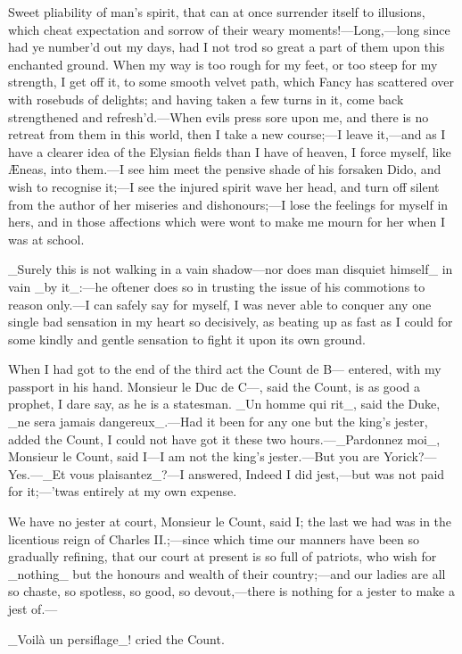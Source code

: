 \documentclass[twoside]{article}
\begin{document}
Sweet pliability of man’s spirit, that can at once surrender itself to
illusions, which cheat expectation and sorrow of their weary
moments!—Long,—long since had ye number’d out my days, had I not trod so
great a part of them upon this enchanted ground.  When my way is too
rough for my feet, or too steep for my strength, I get off it, to some
smooth velvet path, which Fancy has scattered over with rosebuds of
delights; and having taken a few turns in it, come back strengthened and
refresh’d.—When evils press sore upon me, and there is no retreat from
them in this world, then I take a new course;—I leave it,—and as I have a
clearer idea of the Elysian fields than I have of heaven, I force myself,
like Æneas, into them.—I see him meet the pensive shade of his forsaken
Dido, and wish to recognise it;—I see the injured spirit wave her head,
and turn off silent from the author of her miseries and dishonours;—I
lose the feelings for myself in hers, and in those affections which were
wont to make me mourn for her when I was at school.

_Surely this is not walking in a vain shadow—nor does man disquiet
himself_ in vain _by it_:—he oftener does so in trusting the issue of his
commotions to reason only.—I can safely say for myself, I was never able
to conquer any one single bad sensation in my heart so decisively, as
beating up as fast as I could for some kindly and gentle sensation to
fight it upon its own ground.

When I had got to the end of the third act the Count de B— entered, with
my passport in his hand.  Monsieur le Duc de C—, said the Count, is as
good a prophet, I dare say, as he is a statesman.  _Un homme qui rit_,
said the Duke, _ne sera jamais dangereux_.—Had it been for any one but
the king’s jester, added the Count, I could not have got it these two
hours.—_Pardonnez moi_, Monsieur le Count, said I—I am not the king’s
jester.—But you are Yorick?—Yes.—_Et vous plaisantez_?—I answered, Indeed
I did jest,—but was not paid for it;—’twas entirely at my own expense.

We have no jester at court, Monsieur le Count, said I; the last we had
was in the licentious reign of Charles II.;—since which time our manners
have been so gradually refining, that our court at present is so full of
patriots, who wish for _nothing_ but the honours and wealth of their
country;—and our ladies are all so chaste, so spotless, so good, so
devout,—there is nothing for a jester to make a jest of.—

_Voilà un persiflage_! cried the Count.
\end{document}
